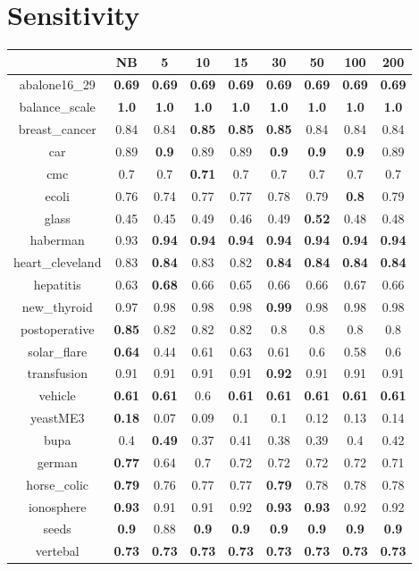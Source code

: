 \documentclass{article}%
\begin{document}
%
\section*{Sensitivity}%
\begin{tabular}{c|cccccccc}%
\hline%
&NB&5&10&15&30&50&100&200\\%
\hline%
abalone16\_29&\textbf{0.69}&\textbf{0.69}&\textbf{0.69}&\textbf{0.69}&\textbf{0.69}&\textbf{0.69}&\textbf{0.69}&\textbf{0.69}\\%
\hline%
balance\_scale&\textbf{1.0}&\textbf{1.0}&\textbf{1.0}&\textbf{1.0}&\textbf{1.0}&\textbf{1.0}&\textbf{1.0}&\textbf{1.0}\\%
\hline%
breast\_cancer&0.84&0.84&\textbf{0.85}&\textbf{0.85}&\textbf{0.85}&0.84&0.84&0.84\\%
\hline%
car&0.89&\textbf{0.9}&0.89&0.89&\textbf{0.9}&\textbf{0.9}&\textbf{0.9}&0.89\\%
\hline%
cmc&0.7&0.7&\textbf{0.71}&0.7&0.7&0.7&0.7&0.7\\%
\hline%
ecoli&0.76&0.74&0.77&0.77&0.78&0.79&\textbf{0.8}&0.79\\%
\hline%
glass&0.45&0.45&0.49&0.46&0.49&\textbf{0.52}&0.48&0.48\\%
\hline%
haberman&0.93&\textbf{0.94}&\textbf{0.94}&\textbf{0.94}&\textbf{0.94}&\textbf{0.94}&\textbf{0.94}&\textbf{0.94}\\%
\hline%
heart\_cleveland&0.83&\textbf{0.84}&0.83&0.82&\textbf{0.84}&\textbf{0.84}&\textbf{0.84}&\textbf{0.84}\\%
\hline%
hepatitis&0.63&\textbf{0.68}&0.66&0.65&0.66&0.66&0.67&0.66\\%
\hline%
new\_thyroid&0.97&0.98&0.98&0.98&\textbf{0.99}&0.98&0.98&0.98\\%
\hline%
postoperative&\textbf{0.85}&0.82&0.82&0.82&0.8&0.8&0.8&0.8\\%
\hline%
solar\_flare&\textbf{0.64}&0.44&0.61&0.63&0.61&0.6&0.58&0.6\\%
\hline%
transfusion&0.91&0.91&0.91&0.91&\textbf{0.92}&0.91&0.91&0.91\\%
\hline%
vehicle&\textbf{0.61}&\textbf{0.61}&0.6&\textbf{0.61}&\textbf{0.61}&\textbf{0.61}&\textbf{0.61}&\textbf{0.61}\\%
\hline%
yeastME3&\textbf{0.18}&0.07&0.09&0.1&0.1&0.12&0.13&0.14\\%
\hline%
bupa&0.4&\textbf{0.49}&0.37&0.41&0.38&0.39&0.4&0.42\\%
\hline%
german&\textbf{0.77}&0.64&0.7&0.72&0.72&0.72&0.72&0.71\\%
\hline%
horse\_colic&\textbf{0.79}&0.76&0.77&0.77&\textbf{0.79}&0.78&0.78&0.78\\%
\hline%
ionosphere&\textbf{0.93}&0.91&0.91&0.92&\textbf{0.93}&\textbf{0.93}&0.92&0.92\\%
\hline%
seeds&\textbf{0.9}&0.88&\textbf{0.9}&\textbf{0.9}&\textbf{0.9}&\textbf{0.9}&\textbf{0.9}&\textbf{0.9}\\%
\hline%
vertebal&\textbf{0.73}&\textbf{0.73}&\textbf{0.73}&\textbf{0.73}&\textbf{0.73}&\textbf{0.73}&\textbf{0.73}&\textbf{0.73}\\%
\hline%
\end{tabular}
\end{document}
